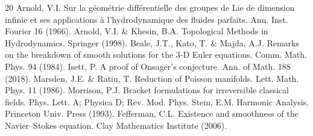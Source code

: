 \documentclass[11pt,a4paper]{article}
\begin{document}
\begin{thebibliography}{20}
 Arnold, V.I. Sur la géométrie différentielle des groupes de Lie de dimension infinie et ses applications à l'hydrodynamique des fluides parfaits. Ann. Inst. Fourier 16 (1966).
 Arnold, V.I. \& Khesin, B.A. Topological Methods in Hydrodynamics. Springer (1998).
 Beale, J.T., Kato, T. \& Majda, A.J. Remarks on the breakdown of smooth solutions for the 3-D Euler equations. Comm. Math. Phys. 94 (1984).
 Isett, P. A proof of Onsager's conjecture. Ann. of Math. 188 (2018).
 Marsden, J.E. \& Ratiu, T. Reduction of Poisson manifolds. Lett. Math. Phys. 11 (1986).
 Morrison, P.J. Bracket formulations for irreversible classical fields. Phys. Lett. A; Physica D; Rev. Mod. Phys.
 Stein, E.M. Harmonic Analysis. Princeton Univ. Press (1993).
 Fefferman, C.L. Existence and smoothness of the Navier--Stokes equation. Clay Mathematics Institute (2006).
\end{thebibliography}
\end{document}

